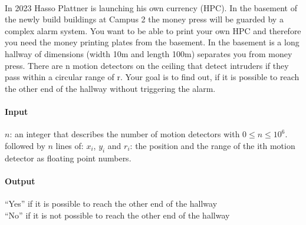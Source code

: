 



\makeheader

\\
In 2023 Hasso Plattner is launching his own currency (HPC). In the basement of the newly build buildings at Campus 2 the money press will be guarded by a complex alarm system. 
You want to be able to print your own HPC and therefore you need the money printing plates from the basement. 
In the basement is a long hallway of dimensions (width 10m and length 100m) separates you from money press. There are n motion detectors on the ceiling that detect intruders if they pass within a circular range of r. 
Your goal is to find out, if it is possible to reach the other end of the hallway without triggering the alarm. 

\paragraph*{Input}
$n$: an integer that describes the number of motion detectors with $0 \leq n \leq 10^6$.\\
followed by $n$ lines of:
$x_i$, $y_i$ and $r_i$: the position and the range of the ith motion detector as floating point numbers. 


\paragraph*{Output}
“Yes” if it is possible to reach the other end of the hallway \\
“No” if it is not possible to reach the other end of the hallway


\begin{samples}
\end{samples}


